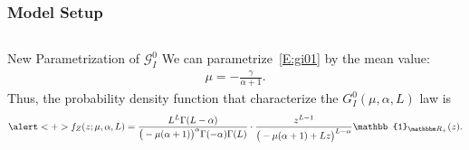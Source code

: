 \documentclass[aspectratio=1610,10pt]{beamer}
\begin{document}
\begin{frame} \frametitle{\large{Model Setup}}\vspace{0.4cm}	

 \justifying
\begin{columns}[T,onlytextwidth]
    \begin{column}{.99\textwidth}
			\begin{block}{New Parametrization of \(\mathcal{G}_I^0\) }\justifying
			\vspace{0.4cm}
We can parametrize~\eqref{E:gi01} by the mean value: \begin{align*}
    \mu=-\frac{\gamma}{\alpha+1}.
\end{align*} 
\pause
Thus, the probability density function that characterize
the \(G_I^0(\mu, \alpha, L)\) law is \begin{align*}
       \alert<+>{f_Z(z; \mu, \alpha, L)=\frac{L^L\Gamma(L-\alpha)}{\big(-\mu(\alpha+1)\big)^{\alpha}\Gamma(-\alpha)\Gamma(L)}\cdot\frac{z^{L-1}}{\big(-\mu(\alpha+1)+Lz\big)^{L-\alpha}}\mathbb{1}_{\mathbbm R_+}(z)}.
\end{align*}
	\end{block}
	\
		
    \end{column}
    
\end{columns}%
\end{frame} 
\end{document}
